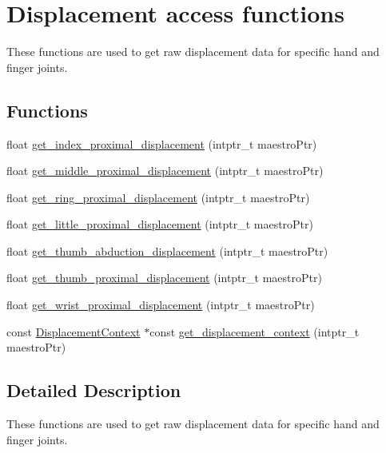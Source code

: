 \hypertarget{group__displacement_access}{}\section{Displacement access functions}
\label{group__displacement_access}


These functions are used to get raw displacement data for specific hand and finger joints.  


\subsection*{Functions}
\begin{DoxyCompactItemize}
\item 
float \hyperlink{group__displacement_access_gaa1bfb69dab314ccf7e6dc1df6d3657bc}{get\+\_\+index\+\_\+proximal\+\_\+displacement} (intptr\+\_\+t maestro\+Ptr)
\item 
float \hyperlink{group__displacement_access_gabcd534e7e94fcbb7b35ce0406dd500bd}{get\+\_\+middle\+\_\+proximal\+\_\+displacement} (intptr\+\_\+t maestro\+Ptr)
\item 
float \hyperlink{group__displacement_access_ga61acc449d1bb171722abef39f2c9d8bf}{get\+\_\+ring\+\_\+proximal\+\_\+displacement} (intptr\+\_\+t maestro\+Ptr)
\item 
float \hyperlink{group__displacement_access_ga010054a4a8e649390d426732de2e8792}{get\+\_\+little\+\_\+proximal\+\_\+displacement} (intptr\+\_\+t maestro\+Ptr)
\item 
float \hyperlink{group__displacement_access_gaed15e3a23d0b98f46f78d7dadca62668}{get\+\_\+thumb\+\_\+abduction\+\_\+displacement} (intptr\+\_\+t maestro\+Ptr)
\item 
float \hyperlink{group__displacement_access_ga86d0adfde28a3008a21fb4620e4b93df}{get\+\_\+thumb\+\_\+proximal\+\_\+displacement} (intptr\+\_\+t maestro\+Ptr)
\item 
float \hyperlink{group__displacement_access_gab799e09f1b944ca87b1567a9a9ae2ee4}{get\+\_\+wrist\+\_\+proximal\+\_\+displacement} (intptr\+\_\+t maestro\+Ptr)
\item 
const \hyperlink{struct_displacement_context}{Displacement\+Context} $\ast$const \hyperlink{group__displacement_access_ga26563f1c104bd9a0d80ab8c0afd1e8bd}{get\+\_\+displacement\+\_\+context} (intptr\+\_\+t maestro\+Ptr)
\end{DoxyCompactItemize}


\subsection{Detailed Description}
These functions are used to get raw displacement data for specific hand and finger joints. 

